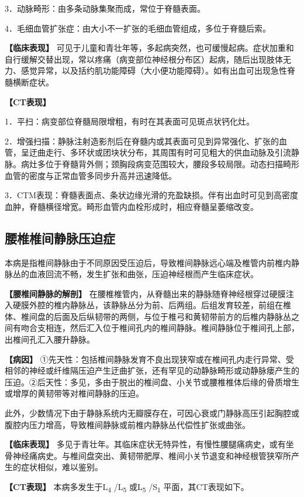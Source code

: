 3．动脉畸形：由多条动脉集聚而成，常位于脊髓表面。

4．毛细血管扩张症：由大小不一扩张的毛细血管组成，多位于脊髓后索。

\textbf{【临床表现】}
可见于儿童和青壮年等，多起病突然，也可缓慢起病。症状加重和自行缓解交替出现，常以疼痛（病变部位神经根分布区）起病，随后出现肢体无力、感觉异常，以及括约肌功能障碍（大小便功能障碍）。如有出血可出现急性脊髓横断症状。

\textbf{【CT表现】}

1．平扫：病变部位脊髓局限增粗，有时在其表面可见斑点状钙化灶。

2．增强扫描：静脉注射造影剂后在脊髓内或其表面可见到异常强化、扩张的血管，呈迂曲走行、多环状或团块状分布，其周围有时可见粗大的供血动脉及引流静脉。病灶多位于脊髓背外侧；颈胸段病变范围较大，腰段多较局限。动态扫描畸形血管的密度与正常血管多同步升高并迅速降低。

3．CTM表现：脊髓表面点、条状边缘光滑的充盈缺损。伴有出血时可见到高密度血肿，脊髓横径增宽。畸形血管内血栓形成时，相应脊髓呈萎缩改变。

\subsection{腰椎椎间静脉压迫症}

本病是指椎间静脉由于不同原因受压迫后，导致椎间静脉远心端及椎管内前椎内静脉丛的血液回流不畅，发生扩张和曲张，压迫神经根而产生临床症状。

\textbf{【腰椎间静脉的解剖】}
在腰椎椎管内，从脊髓出来的静脉随脊神经根穿过硬膜注入硬膜外腔的椎内静脉丛，该静脉丛分为前、后两组。后组发育较差，前组在椎体、椎间盘的后面及后纵韧带的两侧，与位于椎弓和黄韧带前方的后椎内静脉丛之间有吻合支相连，然后汇入位于椎间孔内的椎间静脉。椎间静脉位于椎间孔上部，出椎间孔汇入腰升静脉。

\textbf{【病因】}
①先天性：包括椎间静脉发育不良出现狭窄或在椎间孔内走行异常、受相邻的神经或纤维隔压迫产生迂曲扩张，还有罕见的动静脉畸形或动静脉瘘产生的压迫。②后天性：多见，多由于脱出的椎间盘、小关节或腰椎椎体后缘的骨质增生或增厚的黄韧带等对椎间静脉的压迫。

此外，少数情况下由于静脉系统内无瓣膜存在，可因心衰或门静脉高压引起胸腔或腹腔内压力增高，导致椎间静脉或前椎内静脉丛代偿性扩张或曲张。

\textbf{【临床表现】}
多见于青壮年。其临床症状无特异性，有慢性腰腿痛病史，或有坐骨神经痛病史。与椎间盘突出、黄韧带肥厚、椎间小关节退变和神经根管狭窄所产生的症状相似，难以鉴别。

\textbf{【CT表现】} 本病多发生于L\textsubscript{4} /L\textsubscript{5}
或L\textsubscript{5} /S\textsubscript{1} 平面，其CT表现如下。

